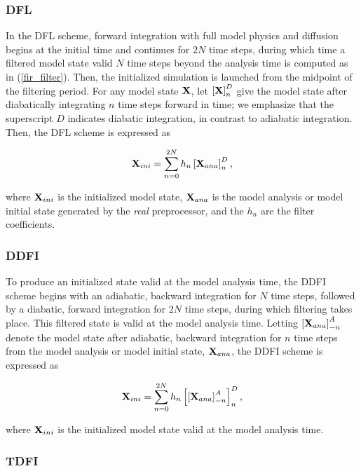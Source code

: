 \subsubsection{DFL}

In the DFL scheme, forward integration with full model physics and diffusion 
begins at the initial time and continues for $2N$ time steps, during which 
time a filtered model state valid $N$ time steps beyond the analysis time is 
computed as in (\ref{fir_filter}). Then, the initialized simulation is 
launched from the midpoint of the filtering period. For any model state ${\bf X}$, 
let $\left[ {\bf X} \right]_n^D$ give the model state after diabatically 
integrating $n$ time steps forward in time; we emphasize that the superscript 
$D$ indicates diabatic integration, in contrast to adiabatic integration. 
Then, the DFL scheme is expressed as

\begin{equation}
{\bf X}_{ini} = \sum_{n=0}^{2N} h_n \left[ {\bf X}_{ana} \right]_n^D,
\end{equation}

\noindent
where ${\bf X}_{ini}$ is the initialized model state, ${\bf X}_{ana}$ is the 
model analysis or model initial state generated by the {\it real} preprocessor, 
and the $h_n$ are the filter coefficients.

\subsubsection{DDFI}

To produce an initialized state valid at the model analysis time, the DDFI 
scheme begins with an adiabatic, backward integration for $N$ time steps, 
followed by a diabatic, forward integration for $2N$ time steps, during which 
filtering takes place. This filtered state is valid at the model analysis time. 
Letting $\left[ {\bf X}_{ana} \right]_{-n}^A$ denote the model state after 
adiabatic, backward integration for $n$ time steps from the model analysis or 
model initial state, ${\bf X}_{ana}$, the DDFI scheme is expressed as

\begin{equation}
{\bf X}_{ini} = \sum_{n=0}^{2N} h_n \left[    \left[ {\bf X}_{ana} \right]_{-n}^A   \right]_n^D,
\end{equation}

\noindent
where ${\bf X}_{ini}$ is the initialized model state valid at the model analysis time.

\subsubsection{TDFI}

